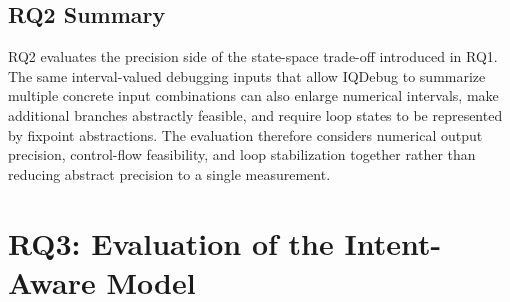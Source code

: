 \documentclass[11pt,oneside]{report}
\theoremstyle{plain}
\theoremstyle{definition}
\theoremstyle{remark}
\begin{document}
\subsection{RQ2 Summary}
\label{subsec:eval:rq2:summary}

RQ2 evaluates the precision side of the state-space trade-off introduced in RQ1. The same interval-valued debugging inputs that allow IQDebug to summarize multiple concrete input combinations can also enlarge numerical intervals, make additional branches abstractly feasible, and require loop states to be represented by fixpoint abstractions. The evaluation therefore considers numerical output precision, control-flow feasibility, and loop stabilization together rather than reducing abstract precision to a single measurement.



\section{RQ3: Evaluation of the Intent-Aware Model}\label{sec:eval:rq3}
\end{document}
